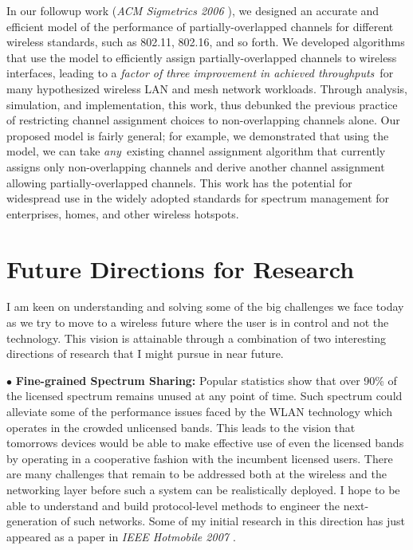 \documentclass[11pt,letterpaper]{article}
\begin{document}
In our followup work ({\it ACM Sigmetrics 2006 \cite{sigm2006}}), we designed an accurate and efficient model of the performance of
partially-overlapped channels for different wireless standards, such as 802.11, 802.16, and so forth. We developed
algorithms that use the model to efficiently assign partially-overlapped channels to wireless interfaces, leading to a
{\em factor of three improvement in achieved throughputs}\ for many hypothesized wireless LAN and mesh network
workloads. Through analysis, simulation, and implementation, this work, thus debunked the previous practice of
restricting channel assignment choices to non-overlapping channels alone. Our proposed model is fairly general; for
example, we demonstrated that using the model, we can take {\em any}\ existing channel assignment algorithm that
currently assigns only non-overlapping channels and derive another channel assignment allowing partially-overlapped
channels. This work has the potential for widespread use in the widely adopted standards for spectrum management for
enterprises, homes, and other wireless hotspots.


\section{Future Directions for Research} I am keen on 
understanding and solving some of the big challenges we face today as we try to move to a  wireless future
where the user is in control and not the technology. This vision is attainable through a combination of two interesting 
directions of research that I might pursue in near future.

$\bullet$ {\bf Fine-grained Spectrum Sharing:} Popular statistics show that over 90\% of the licensed spectrum remains
unused at any point of time.  Such spectrum could alleviate some of the performance issues faced by the WLAN technology
which operates in the crowded unlicensed bands. This leads to the vision that tomorrows devices would be able to make
effective use of even the licensed bands by operating in a cooperative fashion with the incumbent licensed users. There
are many challenges that remain to be addressed both at the wireless and the networking layer before such a system can
be realistically deployed. I hope to be able to understand and build protocol-level methods to engineer the
next-generation of such networks. Some of my initial research in this direction has just appeared as a paper in {\it
IEEE Hotmobile 2007 \cite{spark2007}}.
\end{document}
